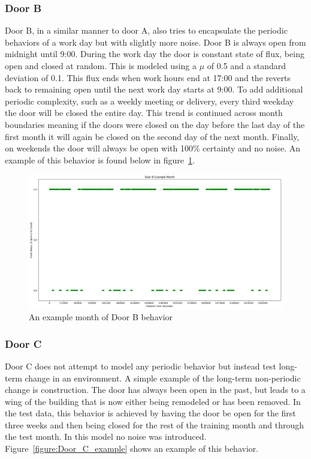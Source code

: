   \subsubsection{ Door B }

  Door B, in a similar manner to door A, also tries to encapsulate the periodic
  behaviors of a work day but with slightly more noise. Door B is always open
  from midnight until 9:00. During the work day
  the door is constant state of flux, being open and closed at random. This is
  modeled using a $\mu$ of 0.5 and a standard deviation of 0.1. This flux ends when
  work hours end at 17:00 and the reverts back to remaining open until
  the next work day starts at 9:00. To add additional periodic complexity, such as a
  weekly meeting or delivery, every third weekday the door will be closed the
  entire day. This trend is continued across month boundaries meaning if
  the doors were closed on the day before the last day of the first month it
  will again be closed on the second day of the next month. Finally, on
  weekends the door will always be open with 100\% certainty and no noise. An
  example of this behavior is found below in figure~\ref{figure:Door_B_example}. \\

  \begin{figure}[!htb]
    \centering
    \includegraphics[width=\linewidth]{images/Door_B_Example_Month.png}
    \caption{An example month of Door B behavior}
    \label{figure:Door_B_example}
  \end{figure}

  \subsubsection{ Door C }

  Door C does not attempt to model any periodic behavior but instead test
  long-term change in an environment. A simple example of the long-term
  non-periodic change is construction. The door has always been
  open in the past, but leads to a wing of the building that is now either
  being remodeled or has been removed. In the test data, this behavior is
  achieved by having the door be open for the first three weeks and then being
  closed for the rest of the training month and through the test month. In
  this model no noise was introduced. Figure~\ref{figure:Door_C_example} shows
  an example of this behavior.\\

